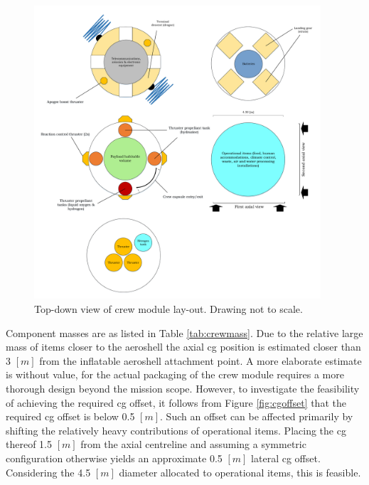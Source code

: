 \begin{figure}[h]
		\centering
		\includegraphics[width=0.95\textwidth]{./Figure/CrewModule/TopviewV2.pdf}
		\caption[Top-down view of crew module lay-out]{Top-down view of crew module lay-out. Drawing not to scale.}
		\label{fig:topview}
\end{figure}

Component masses are as listed in Table \ref{tab:crewmass}. Due to the relative large mass of items closer to the aeroshell the axial \gls{cg} position is estimated closer than 3 $[m]$ from the inflatable aeroshell attachment point. A more elaborate estimate is without value, for the actual packaging of the crew module requires a more thorough design beyond the mission scope. However, to investigate the feasibility of achieving the required \gls{cg} offset, it follows from Figure \ref{fig:cgoffset} that the required \gls{cg} offset is below 0.5 $[m]$. Such an offset can be affected primarily by shifting the relatively heavy contributions of operational items. Placing the \gls{cg} thereof 1.5 $[m]$ from the axial centreline and assuming a symmetric configuration otherwise yields an approximate 0.5 $[m]$ lateral \gls{cg} offset. Considering the 4.5 $[m]$ diameter allocated to operational items, this is feasible. %

